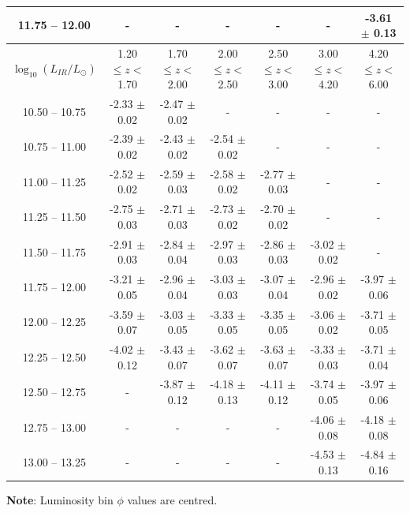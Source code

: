 \begin{landscape}
\begin{table}
\begin{center}
\begin{tabular}{@{}ccccccc@{}}
        11.75 -- 12.00 & -                & -                & -                & -                & -                & -3.61 $\pm$ 0.13 \\
        \hline
        $\log_{10}(L_{IR}/L_{\odot})$ & 1.20 $\leq z <$ 1.70 & 1.70 $\leq z <$ 2.00 & 2.00 $\leq z <$ 2.50 & 2.50 $\leq z <$ 3.00 & 3.00 $\leq z <$ 4.20 & 4.20 $\leq z <$ 6.00  \\
        \hline
        10.50 -- 10.75 & -2.33 $\pm$ 0.02 & -2.47 $\pm$ 0.02 & - & - & - & - \\
        10.75 -- 11.00 & -2.39 $\pm$ 0.02 & -2.43 $\pm$ 0.02 & -2.54 $\pm$ 0.02 & - & - & - \\
        11.00 -- 11.25 & -2.52 $\pm$ 0.02 & -2.59 $\pm$ 0.03 & -2.58 $\pm$ 0.02 & -2.77 $\pm$ 0.03 & - & - \\
        11.25 -- 11.50 & -2.75 $\pm$ 0.03 & -2.71 $\pm$ 0.03 & -2.73 $\pm$ 0.02 & -2.70 $\pm$ 0.02 & - & - \\
        11.50 -- 11.75 & -2.91 $\pm$ 0.03 & -2.84 $\pm$ 0.04 & -2.97 $\pm$ 0.03 & -2.86 $\pm$ 0.03 & -3.02 $\pm$ 0.02 & - \\
        11.75 -- 12.00 & -3.21 $\pm$ 0.05 & -2.96 $\pm$ 0.04 & -3.03 $\pm$ 0.03 & -3.07 $\pm$ 0.04 & -2.96 $\pm$ 0.02 & -3.97 $\pm$ 0.06 \\
        12.00 -- 12.25 & -3.59 $\pm$ 0.07 & -3.03 $\pm$ 0.05 & -3.33 $\pm$ 0.05 & -3.35 $\pm$ 0.05 & -3.06 $\pm$ 0.02 & -3.71 $\pm$ 0.05 \\
        12.25 -- 12.50 & -4.02 $\pm$ 0.12 & -3.43 $\pm$ 0.07 & -3.62 $\pm$ 0.07 & -3.63 $\pm$ 0.07 & -3.33 $\pm$ 0.03 & -3.71 $\pm$ 0.04 \\
        12.50 -- 12.75 & -                & -3.87 $\pm$ 0.12 & -4.18 $\pm$ 0.13 & -4.11 $\pm$ 0.12 & -3.74 $\pm$ 0.05 & -3.97 $\pm$ 0.06 \\
        12.75 -- 13.00 & -                & -                & -                & -                & -4.06 $\pm$ 0.08 & -4.18 $\pm$ 0.08 \\
        13.00 -- 13.25 & -                & -                & -                & -                & -4.53 $\pm$ 0.13 & -4.84 $\pm$ 0.16 \\
        \bottomrule
    \end{tabular}
    \end{center}
    \textbf{Note}: Luminosity bin $\phi$ values are centred.
    \end{table}
\end{landscape}

